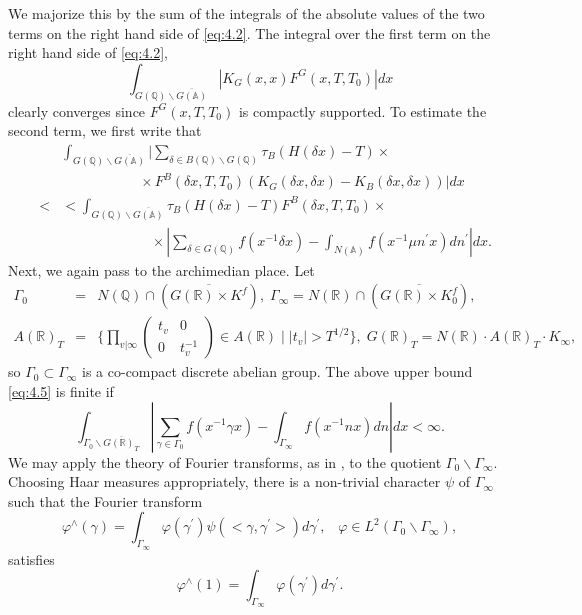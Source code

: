 We majorize this by the sum of the integrals of the absolute values of the
two terms on the right hand side of \eqref{eq:4.2}. The integral over the first term
on the right hand side of \eqref{eq:4.2}, 
\[
\int_{G({\mathbb{Q}})\backslash \overline{G({\mathbb{A}})}}|K_G(x,x)F^G(x,T,T_0)|dx 
\]
clearly converges since $F^G(x,T,T_0)$ is compactly supported. To estimate
the second term, we first write that 
\begin{eqnarray}
&&\int_{G({\mathbb{Q}})\backslash \overline{G({\mathbb{A}})}}|
\sum_{\delta \in B({\mathbb{Q}})\backslash G({\mathbb{Q}})}
\tau _B(H(\delta x)-T)\times \label{eq:4.3}\\
&&\;\;\;\;\;\;\;\;\;\;\;\;\;\;\;\;\;\;\;\;\times F^B(\delta
x,T,T_0)(K_G(\delta x,\delta x)-K_B(\delta x,\delta x))|dx \label{eq:4.4}\\
&<&<\int_{G({\mathbb{Q}})\backslash \overline{G({\mathbb{A}})}}
\tau _B(H(\delta x)-T)F^B(\delta x,T,T_0)\times  \nonumber \\
&&\;\;\;\;\;\;\;\;\;\;\;\;\;\;\;\;\;\;\;\;\;\;\;\times
|\sum_{\delta \in G({\mathbb{Q}})}f(x^{-1}\delta x)
-\int_{N({\mathbb{A}})}f(x^{-1}\mu n^{\prime }x)dn^{\prime }|dx.
\label{eq:4.5}\end{eqnarray}
Next, we again pass to the archimedian place. Let 
\begin{eqnarray}
\Gamma _0 &=&N({\mathbb{Q}})\cap (\overline{G({\mathbb{R}})\times K^f}),
\;\Gamma_\infty
=N({\mathbb{R}})\cap (\overline{G({\mathbb{R}})\times K_0^f}),\; \label{eq:4.6}\\
A({\mathbb{R}})_T &=&\{\prod_{v|\infty}
\left( 
\begin{array}{cc}
t_v & 0 \\ 
0 & t_v^{-1}
\end{array}
\right) \in A({\mathbb{R}})\;|\;|t_v|>T^{1/2}\},
\;G({\mathbb{R}})_T=N({\mathbb{R}})\cdot A({\mathbb{R}})_T\cdot K_\infty ,  
\nonumber
\end{eqnarray}
so $\Gamma _0\subset \Gamma _\infty $ is a co-compact discrete abelian
group. The above upper bound \eqref{eq:4.5} is finite if 
\begin{equation}\label{eq:4.7}
\int_{\Gamma _0\backslash \overline{G({\mathbb{R}})_T}}|\sum_{\gamma \in \Gamma
_0}f(x^{-1}\gamma x)-\int_{\Gamma _\infty }f(x^{-1}nx)dn|dx<\infty .
\end{equation}
We may apply the theory of Fourier transforms, as in \cite{W1}, to the 
quotient $\Gamma _0\backslash \Gamma _\infty $. 
Choosing Haar measures appropriately,
there is a non-trivial character 
$\psi $ of $\Gamma _\infty $ such that the Fourier transform 
\[
\varphi ^{\wedge }(\gamma )
=\int_{\Gamma _\infty }\varphi (\gamma ^{\prime})
\psi (<\gamma ,\gamma ^{\prime }>)d\gamma ^{\prime },
\;\;\;\varphi \in L^2(\Gamma _0\backslash \Gamma _\infty ), 
\]
satisfies 
\[
\varphi ^{\wedge }(1)=\int_{\Gamma _\infty }\varphi (\gamma ^{\prime
})d\gamma ^{\prime }. 
\]

